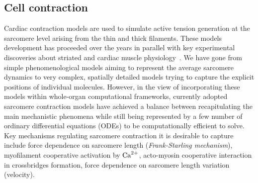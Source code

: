 %
%
%
\subsection{Cell contraction}\label{sec:mathcellcontr}
Cardiac contraction models are used to simulate active tension generation at the sarcomere level arising from the thin and thick filaments. These models development has proceeded over the years in parallel with key experimental discoveries about striated and cardiac muscle physiology~\cite{Niederer:2019}. We have gone from simple phenomenological models aiming to represent the average sarcomere dynamics to very complex, spatially detailed models trying to capture the explicit positions of individual molecules. However, in the view of incorporating these models within whole-organ computational frameworks, currently adopted sarcomere contraction models have achieved a balance between recapitulating the main mechanistic phenomena while still being represented by a few number of ordinary differential equations (\acs{ODE}s) to be computationally efficient to solve. Key mechanisms regulating sarcomere contraction it is desirable to capture include force dependence on sarcomere length (\textit{Frank-Starling mechanism}), myofilament cooperative activation by $\textrm{Ca}^{2+}$, acto-myosin cooperative interaction in crossbridges formation, force dependence on sarcomere length variation (velocity).




